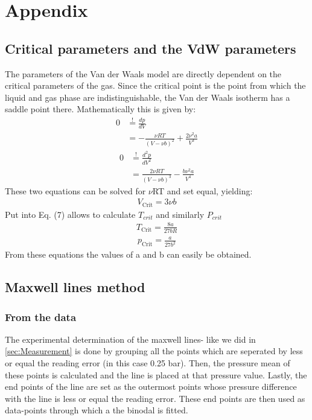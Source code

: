 \documentclass[a4paper,10pt,twocolumn]{article}
\begin{document}
    \section[]{Appendix}\label{sec:apendix}
    \subsection{Critical parameters and the VdW parameters}\label{subsec:criticalParams}
    The parameters of the Van der Waals model are directly dependent on the critical parameters of the gas.
    Since the critical point is the point from which the liquid and gas phase are indistinguishable, the Van der Waals isotherm has a saddle point there.
    Mathematically this is given by:
    \begin{equation}\label{eq:anh1}
    \begin{split}
        0 & \overset{!}{=}\frac{dp}{dV}\\
        & =-\frac{\nu R T}{(V-\nu b)^2}+\frac{2 \nu^2 a}{V^3}
    \end{split}
    \end{equation}
\begin{equation}\label{eq:anh2}
\begin{split}
    0 & \overset{!}{=}\frac{d^2p}{dV^2}\\
    & =\frac{2 \nu R T}{(V-\nu b)^3}-\frac{b \nu^2 a}{V^4}
\end{split}
\end{equation}
These two equations can be solved for $\nu$RT and set equal, yielding:
\begin{align}
    V_\text{Crit} = 3\nu b
\end{align}
Put into Eq. (7) allows to calculate $T_{crit}$ and similarly $P_{crit}$
\begin{align}
    T_\text{Crit}=\frac{8a}{27bR}
\end{align}
\begin{align}
    p_\text{Crit}=\frac{a}{27b^2}
\end{align}
    From these equations the values of a and b can easily be obtained.
    \subsection{Maxwell lines method}\label{subsec:maxwellMethod}
    \subsubsection{From the data}\label{subsubsec:maxwellFormData}
    The experimental determination of the maxwell lines- like we did in \ref{sec:Measurement} is done by  grouping all the points which are seperated by less or equal the reading error (in this case 0.25 bar).
    Then, the pressure mean of these points is calculated and the line is placed at that pressure value. 
    Lastly, the end points of the line are set as the outermost points whose pressure difference with the line is less or equal the reading error.
    These end points are then used as data-points through which a the binodal is fitted.
\end{document}
